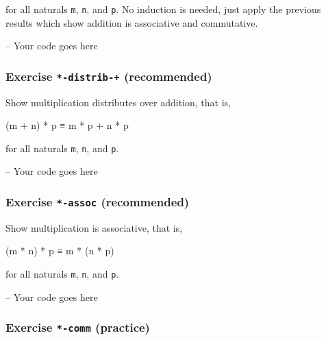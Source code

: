 for all naturals \texttt{m}, \texttt{n}, and \texttt{p}. No induction is
needed, just apply the previous results which show addition is
associative and commutative.

\begin{fence}
\begin{code}
-- Your code goes here
\end{code}
\end{fence}

\hypertarget{Induction-times-distrib-plus}{%
\subsubsection{\texorpdfstring{Exercise \texttt{*-distrib-+}
(recommended)}{Exercise *-distrib-+ (recommended)}}\label{Induction-times-distrib-plus}}

Show multiplication distributes over addition, that is,

\begin{myDisplay}
(m + n) * p ≡ m * p + n * p
\end{myDisplay}

for all naturals \texttt{m}, \texttt{n}, and \texttt{p}.

\begin{fence}
\begin{code}
-- Your code goes here
\end{code}
\end{fence}

\hypertarget{Induction-times-assoc}{%
\subsubsection{\texorpdfstring{Exercise \texttt{*-assoc}
(recommended)}{Exercise *-assoc (recommended)}}\label{Induction-times-assoc}}

Show multiplication is associative, that is,

\begin{myDisplay}
(m * n) * p ≡ m * (n * p)
\end{myDisplay}

for all naturals \texttt{m}, \texttt{n}, and \texttt{p}.

\begin{fence}
\begin{code}
-- Your code goes here
\end{code}
\end{fence}

\hypertarget{Induction-times-comm}{%
\subsubsection{\texorpdfstring{Exercise \texttt{*-comm}
(practice)}{Exercise *-comm (practice)}}\label{Induction-times-comm}}

